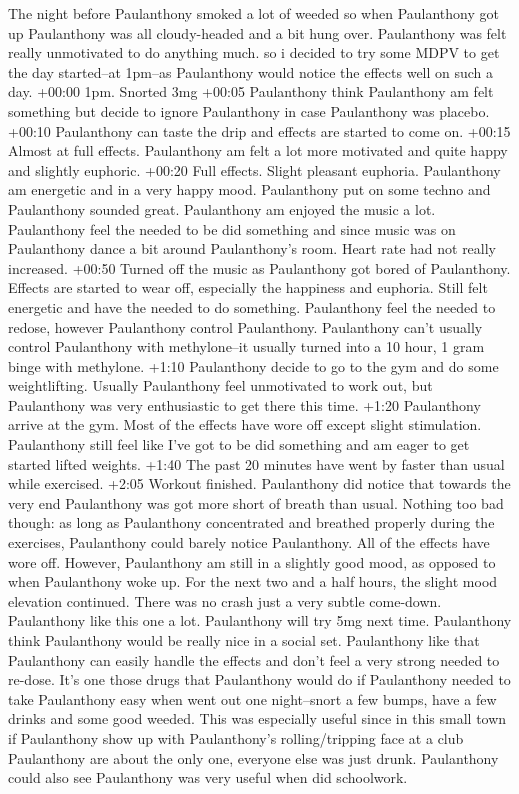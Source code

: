 \documentclass[12pt]{book}
\begin{document}
The night before Paulanthony smoked a lot of weeded so when Paulanthony got up Paulanthony was all cloudy-headed and a bit hung over. Paulanthony was felt really unmotivated to do anything much. so i decided to try some MDPV to get the day started--at 1pm--as Paulanthony would notice the effects well on such a day. +00:00 1pm. Snorted 3mg +00:05 Paulanthony think Paulanthony am felt something but decide to ignore Paulanthony in case Paulanthony was placebo. +00:10 Paulanthony can taste the drip and effects are started to come on. +00:15 Almost at full effects. Paulanthony am felt a lot more motivated and quite happy and slightly euphoric. +00:20 Full effects. Slight pleasant euphoria. Paulanthony am energetic and in a very happy mood. Paulanthony put on some techno and Paulanthony sounded great. Paulanthony am enjoyed the music a lot. Paulanthony feel the needed to be did something and since music was on Paulanthony dance a bit around Paulanthony's room. Heart rate had not really increased. +00:50 Turned off the music as Paulanthony got bored of Paulanthony. Effects are started to wear off, especially the happiness and euphoria. Still felt energetic and have the needed to do something. Paulanthony feel the needed to redose, however Paulanthony control Paulanthony. Paulanthony can't usually control Paulanthony with methylone--it usually turned into a 10 hour, 1 gram binge with methylone. +1:10 Paulanthony decide to go to the gym and do some weightlifting. Usually Paulanthony feel unmotivated to work out, but Paulanthony was very enthusiastic to get there this time. +1:20 Paulanthony arrive at the gym. Most of the effects have wore off except slight stimulation. Paulanthony still feel like I've got to be did something and am eager to get started lifted weights. +1:40 The past 20 minutes have went by faster than usual while exercised. +2:05 Workout finished. Paulanthony did notice that towards the very end Paulanthony was got more short of breath than usual. Nothing too bad though: as long as Paulanthony concentrated and breathed properly during the exercises, Paulanthony could barely notice Paulanthony. All of the effects have wore off. However, Paulanthony am still in a slightly good mood, as opposed to when Paulanthony woke up. For the next two and a half hours, the slight mood elevation continued. There was no crash just a very subtle come-down. Paulanthony like this one a lot. Paulanthony will try 5mg next time. Paulanthony think Paulanthony would be really nice in a social set. Paulanthony like that Paulanthony can easily handle the effects and don't feel a very strong needed to re-dose. It's one those drugs that Paulanthony would do if Paulanthony needed to take Paulanthony easy when went out one night--snort a few bumps, have a few drinks and some good weeded. This was especially useful since in this small town if Paulanthony show up with Paulanthony's rolling/tripping face at a club Paulanthony are about the only one, everyone else was just drunk. Paulanthony could also see Paulanthony was very useful when did schoolwork.
\end{document}
